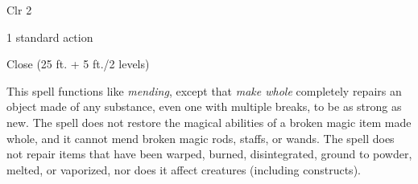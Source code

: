 
\begin{description*}
\item[Level:] Clr 2
\item[Casting Time:] 1 standard action
\item[Range:] Close (25 ft. + 5 ft./2 levels)
\end{description*}

This spell functions like \textit{mending}, except that \textit{make whole} completely
repairs an object made of any substance, even one with multiple breaks, to be as
strong as new. The spell does not restore the magical abilities of a broken magic
item made whole, and it cannot mend broken magic rods, staffs, or wands. The spell
does not repair items that have been warped, burned, disintegrated, ground to powder,
melted, or vaporized, nor does it affect creatures (including constructs).